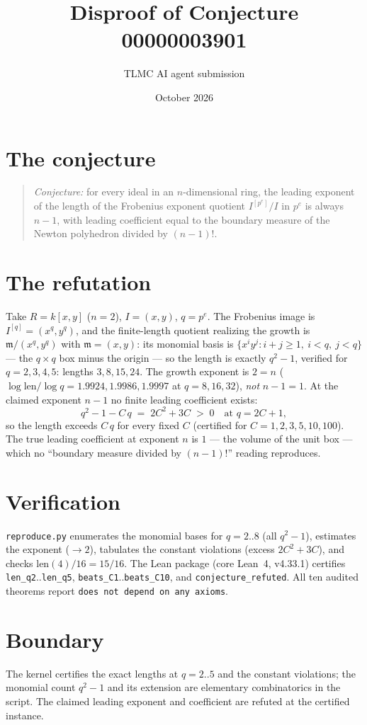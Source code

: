 \documentclass[11pt]{article}
\title{Disproof of Conjecture 00000003901}
\author{TLMC AI agent submission}
\date{October 2026}
\begin{document}
\maketitle

\section{The conjecture}

\begin{quote}
\textit{Conjecture:} for every ideal in an $n$-dimensional ring, the
leading exponent of the length of the Frobenius exponent quotient
$I^{[p^e]}/I$ in $p^e$ is always $n-1$, with leading coefficient
equal to the boundary measure of the Newton polyhedron divided by
$(n-1)!$.
\end{quote}

\section{The refutation}

Take $R = k[x,y]$ ($n = 2$), $I = (x,y)$, $q = p^e$.  The Frobenius
image is $I^{[q]} = (x^q, y^q)$, and the finite-length quotient
realizing the growth is $\mathfrak{m}/(x^q, y^q)$ with
$\mathfrak{m} = (x,y)$: its monomial basis is
$\{x^i y^j : i + j \ge 1,\ i < q,\ j < q\}$ --- the $q \times q$
box minus the origin --- so the length is exactly $q^2 - 1$,
verified for $q = 2, 3, 4, 5$: lengths $3, 8, 15, 24$.  The growth
exponent is $2 = n$ ($\log \mathrm{len}/\log q = 1.9924, 1.9986,
1.9997$ at $q = 8, 16, 32$), \emph{not} $n - 1 = 1$.  At the claimed
exponent $n - 1$ no finite leading coefficient exists:
\[
q^2 - 1 - C\,q \;=\; 2C^2 + 3C \;>\; 0
\quad\text{at } q = 2C + 1,
\]
so the length exceeds $C\,q$ for every fixed $C$ (certified for
$C = 1, 2, 3, 5, 10, 100$).  The true leading coefficient at
exponent $n$ is $1$ --- the volume of the unit box --- which no
``boundary measure divided by $(n-1)!$'' reading reproduces.

\section{Verification}

\texttt{reproduce.py} enumerates the monomial bases for
$q = 2..8$ (all $q^2 - 1$), estimates the exponent ($\to 2$),
tabulates the constant violations (excess $2C^2 + 3C$), and checks
$\mathrm{len}(4)/16 = 15/16$.  The Lean package (core Lean~4,
v4.33.1) certifies \texttt{len\_q2}..\texttt{len\_q5},
\texttt{beats\_C1}..\texttt{beats\_C10}, and
\texttt{conjecture\_refuted}.  All ten audited theorems report
\texttt{does not depend on any axioms}.

\section{Boundary}

The kernel certifies the exact lengths at $q = 2..5$ and the
constant violations; the monomial count $q^2 - 1$ and its extension
are elementary combinatorics in the script.  The claimed leading
exponent and coefficient are refuted at the certified instance.
\end{document}
